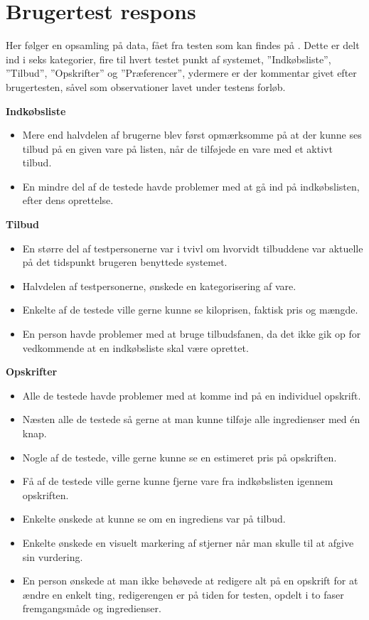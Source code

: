 \chapter{Brugertest respons}\label{b:brugertestrespons}
Her følger en opsamling på data, fået fra testen som kan findes på .
Dette er delt ind i seks kategorier, fire til hvert testet punkt af systemet, ''Indkøbsliste'', ''Tilbud'', ''Opskrifter'' og ''Præferencer'', ydermere er der kommentar givet efter brugertesten, såvel som observationer lavet under testens forløb.

\textbf{Indkøbsliste} 
\begin{itemize}
   \item Mere end halvdelen af brugerne blev først opmærksomme på at der kunne ses tilbud på en given vare på listen, når de tilføjede en vare med et aktivt tilbud.
   \item En mindre del af de testede havde problemer med at gå ind på indkøbslisten, efter dens oprettelse.
\end{itemize}

\textbf{Tilbud} 
\begin{itemize}
   \item En større del af testpersonerne var i tvivl om hvorvidt tilbuddene var aktuelle på det tidspunkt brugeren benyttede systemet.
   \item Halvdelen af testpersonerne, ønskede en kategorisering af vare.
   \item Enkelte af de testede ville gerne kunne se kiloprisen, faktisk pris og mængde.
   \item En person havde problemer med at bruge tilbudsfanen, da det ikke gik op for vedkommende at en indkøbsliste skal være oprettet.
\end{itemize}

\textbf{Opskrifter} 
\begin{itemize}
   \item Alle de testede havde problemer med at komme ind på en individuel opskrift.
   \item Næsten alle de testede så gerne at man kunne tilføje alle ingredienser med én knap.
   \item Nogle af de testede, ville gerne kunne se en estimeret pris på opskriften.
   \item Få af de testede ville gerne kunne fjerne vare fra indkøbslisten igennem opskriften.
   \item Enkelte ønskede at kunne se om en ingrediens var på tilbud.
   \item Enkelte ønskede en visuelt markering af stjerner når man skulle til at afgive sin vurdering.
   \item En person ønskede at man ikke behøvede at redigere alt på en opskrift for at ændre en enkelt ting, redigerengen er på tiden for testen, opdelt i to faser fremgangsmåde og ingredienser.
\end{itemize}

